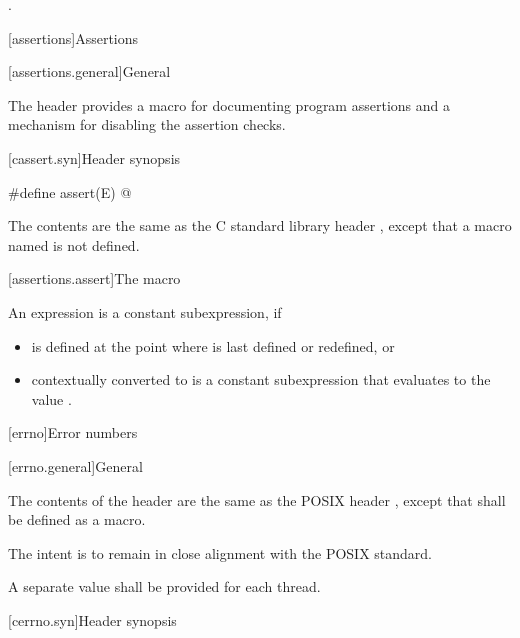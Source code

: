 \begin{itemdescr}
\pnum
\ensures
{}.
\end{itemdescr}

[assertions]{Assertions}

[assertions.general]{General}

\pnum
The header 
provides a macro for documenting \Cpp{} program assertions and a mechanism
for disabling the assertion checks.

[cassert.syn]{Header  synopsis}

%
\begin{codeblock}
#define assert(E) @\seebelow@
\end{codeblock}

\pnum
{}%
The contents are the same as the C standard library header
,
except that a macro named 
is not defined.


[assertions.assert]{The  macro}

\pnum
An expression 
is a constant subexpression, if
\begin{itemize}
\item
{} is defined at the point where 
is last defined or redefined, or
\item
{} contextually converted to 
is a constant subexpression that evaluates to the value .
\end{itemize}

[errno]{Error numbers}

[errno.general]{General}

\pnum
The contents of the header  are the same as the POSIX header
, except that  shall be defined as a macro.
\begin{note}
The intent is to remain in close alignment with the POSIX standard.
\end{note}
A separate  value shall be provided for each thread.

[cerrno.syn]{Header  synopsis}

